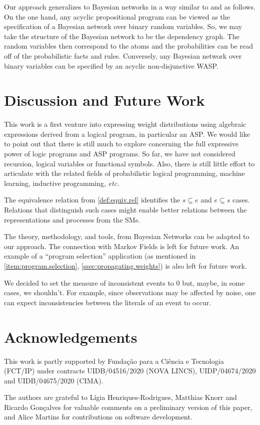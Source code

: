 \documentclass[x11names]{tlp}
\renewcommand{\cite}{\citep}
\begin{document}
Our approach generalizes to Bayesian networks in a way similar to
\cite{cozman2020joy,raedt2016statistical} and
\cite{kiessling1992database,thone1997increased} as follows.
On the one hand, any acyclic propositional program can be viewed as the specification of a Bayesian network over binary random variables.
So, we may take the structure of the Bayesian network to be the dependency graph.
The random variables then correspond to the atoms and the probabilities can be read off of the probabilistic facts and rules.
Conversely, any Bayesian network over binary variables can be specified by an acyclic non-disjunctive \ac{WASP}.

\section{Discussion and Future Work}
\label{sec:discussion}

This work is a first venture into expressing weight distributions using algebraic expressions derived from a logical program, in particular an
\ac{ASP}.
We would like to point out that there is still much to explore concerning the full expressive power of logic programs and \ac{ASP} programs.
So far, we have not considered recursion, logical variables or functional symbols.
Also, there is still little effort to articulate with the related fields of probabilistic logical programming, machine learning, inductive programming, \emph{etc.}

The equivalence relation from \cref{def:equiv.rel} identifies the $s \subseteq e$ and $e \subseteq s$ cases.
Relations that distinguish such cases might enable better relations between the representations and processes from the \aclp{SM}.

The theory, methodology, and tools, from Bayesian Networks can be adapted to our approach.
The connection with Markov Fields \cite{kindermann80} is left for future work.
An example of a ``program selection'' application (as mentioned in \cref{item:program.selection}, \cref{ssec:propagating.weights}) is also left for future work.

We decided to set the measure of inconsistent events to $0$ but, maybe, in some cases, we shouldn't.
For example, since observations may be affected by noise, one can expect inconsistencies between the literals of an event to occur.

\section*{Acknowledgements}

This work is partly supported by Funda\c{c}\~ao para a Ci\^{e}ncia e Tecnologia (FCT/IP) under contracts UIDB/04516/2020 (NOVA LINCS), UIDP/04674/2020 and UIDB/04675/2020 (CIMA).

The authors are grateful to Lígia Henriques-Rodrigues, Matthias Knorr and Ricardo Gonçalves for valuable comments on a preliminary version of this paper, and Alice Martins for contributions on software development.

\ifLNCS  \fi
\ifTLP%
	\ifTLPBIB
		
	\else
		
	\fi
\fi


\end{document}
